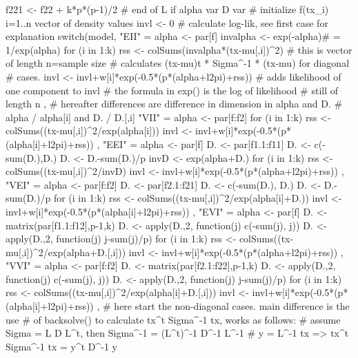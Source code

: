 \begin{Schunk}
\begin{Soutput}
{    f221 <- f22 + k*p*(p-1)/2 # end of L if alpha var   D var
    # initialize f(tx_i) i=1..n  vector of density values
    invl <- 0
    # calculate log-lik, see first case for explanation
    switch(model,
    "EII" = {
        alpha <- par[f]
        invalpha <- exp(-alpha)# = 1/exp(alpha)
        for (i in 1:k) {
            rss <- colSums(invalpha*(tx-mu[,i])^2)
            # this is vector of length n=sample size
            # calculates (tx-mu)t * Sigma^-1 * (tx-mu) for diagonal
            # cases.
            invl <- invl+w[i]*exp(-0.5*(p*(alpha+l2pi)+rss))
            # adds likelihood of one component to invl
            # the formula in exp() is the log of likelihood
            # still of length n
        }
    },
    # hereafter differences are difference in dimension in alpha and D.
    # alpha / alpha[i] and D. / D.[,i]
    "VII" = {
        alpha <- par[f:f2]
        for (i in 1:k) {
            rss <- colSums((tx-mu[,i])^2/exp(alpha[i]))
            invl <- invl+w[i]*exp(-0.5*(p*(alpha[i]+l2pi)+rss))
        }
    },
    "EEI" = {
        alpha <- par[f]
        D. <- par[f1.1:f11]
        D. <- c(-sum(D.),D.)
        D. <- D.-sum(D.)/p
        invD <- exp(alpha+D.)
        for (i in 1:k) {
            rss <- colSums((tx-mu[,i])^2/invD)
            invl <- invl+w[i]*exp(-0.5*(p*(alpha+l2pi)+rss))
        }
    },
    "VEI" = {
        alpha <- par[f:f2]
        D. <- par[f2.1:f21]
        D. <- c(-sum(D.), D.)
        D. <- D.-sum(D.)/p
        for (i in 1:k) {
            rss <- colSums((tx-mu[,i])^2/exp(alpha[i]+D.))
            invl <- invl+w[i]*exp(-0.5*(p*(alpha[i]+l2pi)+rss))
        }
    },
    "EVI" = {
        alpha <- par[f]
        D. <- matrix(par[f1.1:f12],p-1,k)
        D. <- apply(D.,2, function(j) c(-sum(j), j))
        D. <- apply(D.,2, function(j) j-sum(j)/p)
        for (i in 1:k) {
            rss <- colSums((tx-mu[,i])^2/exp(alpha+D.[,i]))
            invl <- invl+w[i]*exp(-0.5*(p*(alpha+l2pi)+rss))
        }
    },
    "VVI" = {
        alpha <- par[f:f2]
        D. <- matrix(par[f2.1:f22],p-1,k)
        D. <- apply(D.,2, function(j) c(-sum(j), j))
        D. <- apply(D.,2, function(j) j-sum(j)/p)
        for (i in 1:k) {
            rss <- colSums((tx-mu[,i])^2/exp(alpha[i]+D.[,i]))
            invl <- invl+w[i]*exp(-0.5*(p*(alpha[i]+l2pi)+rss))
        }
    },
    # here start the non-diagonal cases. main difference is the use
    # of backsolve() to calculate tx^t Sigma^-1 tx, works as follows:
    # assume Sigma = L D L^t, then Sigma^-1 = (L^t)^-1 D^-1 L^-1
    # y = L^-1 tx  => tx^t Sigma^-1 tx = y^t D^-1 y
}
\end{Soutput}
\end{Schunk}
